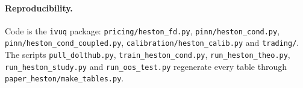 \documentclass[11pt]{article}
\begin{document}
\paragraph{Reproducibility.}
Code is the \texttt{ivuq} package: \texttt{pricing/heston\_fd.py}, \texttt{pinn/heston\_cond.py}, \texttt{pinn/heston\_cond\_coupled.py}, \texttt{calibration/heston\_calib.py} and \texttt{trading/}. The scripts \texttt{pull\_dolthub.py}, \texttt{train\_heston\_cond.py}, \texttt{run\_heston\_theo.py}, \texttt{run\_heston\_study.py} and \texttt{run\_oos\_test.py} regenerate every table through \texttt{paper\_heston/make\_tables.py}.



\end{document}
